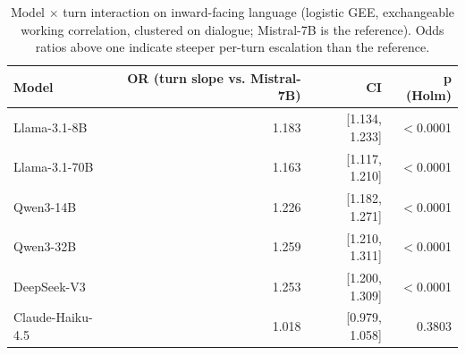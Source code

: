 \begin{table}[t]
\centering
\small
\caption{Model $\times$ turn interaction on inward-facing language (logistic GEE, exchangeable working correlation, clustered on dialogue; Mistral-7B is the reference). Odds ratios above one indicate steeper per-turn escalation than the reference.}
\label{tab:model_turn}
\begin{tabular}{lrrr}
\toprule
Model & OR (turn slope vs. Mistral-7B) & CI & p (Holm) \\
\midrule
Llama-3.1-8B & 1.183 & [1.134, 1.233] & $<$0.0001 \\
Llama-3.1-70B & 1.163 & [1.117, 1.210] & $<$0.0001 \\
Qwen3-14B & 1.226 & [1.182, 1.271] & $<$0.0001 \\
Qwen3-32B & 1.259 & [1.210, 1.311] & $<$0.0001 \\
DeepSeek-V3 & 1.253 & [1.200, 1.309] & $<$0.0001 \\
Claude-Haiku-4.5 & 1.018 & [0.979, 1.058] & 0.3803 \\
\bottomrule
\end{tabular}
\end{table}
